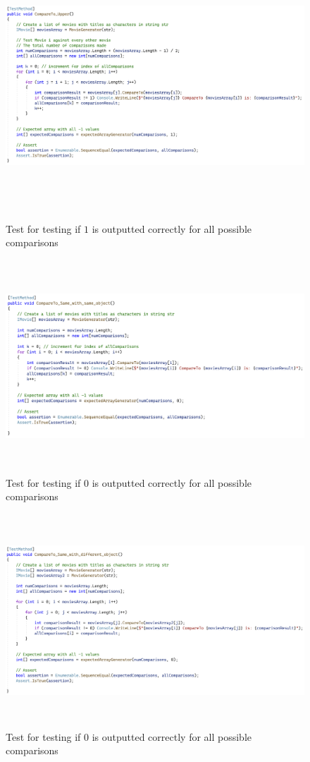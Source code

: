 \documentclass[a4paper]{article}
\begin{document}
\begin{figure}[H]
    \includegraphics[height=10cm]{data/CompareTo_Upper.png}
    \caption{Test for testing if $1$ is outputted correctly for all possible comparisons}
\end{figure}
\begin{figure}[H]
    \includegraphics[height=8cm]{data/CompareTo_Same_with_same_object.png}
    \caption{Test for testing if $0$ is outputted correctly for all possible comparisons}
\end{figure}
\begin{figure}[H]
    \includegraphics[height=8cm]{data/CompareTo_Same_with_different_object.png}
    \caption{Test for testing if $0$ is outputted correctly for all possible comparisons}
\end{figure}
\pagebreak
\end{document}

